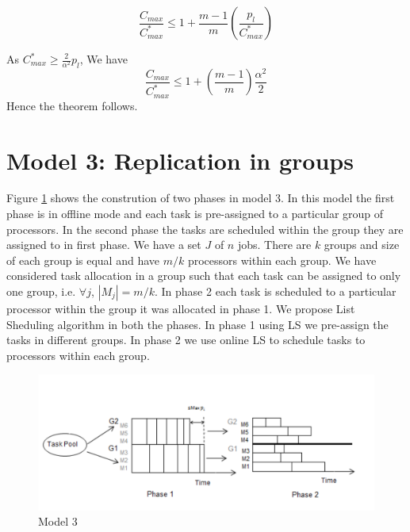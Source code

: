 \documentclass[10pt, conference, compsocconf]{IEEEtran}
\begin{document}
\begin{equation}\nonumber
\frac{C_{max}}{C_{max}^{*}} \leq 1 + {\frac{m-1}{m}}\left(\frac{p_l}{C_{max}^{*}}\right)
\end{equation}

As $C_{max}^{*} \geq {\frac{2}{\alpha^{2}}} p_l $, We have \\

\begin{equation}\nonumber
\frac{C_{max}}{C_{max}^{*}} \leq 1 + \left(\frac{m-1}{m}\right)\frac{\alpha^{2}}{2}
\end{equation}
Hence the theorem follows.   \\                            



\section{Model 3: Replication in groups}
Figure \ref{fig:Model 3} shows the constrution of two phases in model 3.  In this model the first phase is in offline mode and each task is pre-assigned to a particular  group of processors. In the second phase the tasks are scheduled  within the group they are assigned to in first phase.   We have a set $J$ of $ n$ jobs.  There are $k$ groups and size of each group is equal and have $m/k$ processors within each group.  We have considered task allocation in a group such that each task can be assigned to only one group, i.e. $\forall j$, $|M_j|= m/k$.  In phase 2  each task is scheduled to a particular processor within the group it was allocated in phase 1.  We propose  List Sheduling algorithm in both the phases. In phase 1 using LS we pre-assign the tasks in different groups.  In phase 2 we use online LS to schedule tasks to processors within each group.

\begin{figure}[htp]
\centering
\includegraphics[width= 16 cm]{fig2}
\caption{Model 3}
\label{fig:Model 3}
\end{figure}
\end{document}

